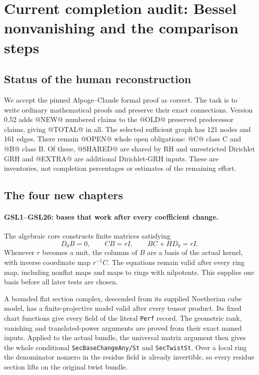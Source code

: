 \section{Current completion audit: Bessel nonvanishing and the comparison steps}
\label{sec:dependency-audit-v52}

\subsection{Status of the human reconstruction}

We accept the pinned Alpoge--Claude formal proof as correct. The task
is to write ordinary mathematical proofs and preserve their exact
connections. Version 0.52 adds @NEW@ numbered claims to the @OLD@
preserved predecessor claims, giving @TOTAL@ in all. The selected
sufficient graph has 121 nodes and 161 edges. There remain @OPEN@
whole open obligations: @C@ class C and @B@ class B. Of these,
@SHARED@ are shared by RH and unrestricted Dirichlet GRH and
@EXTRA@ are additional Dirichlet-GRH inputs. These are inventories,
not completion percentages or estimates of the remaining effort.

\subsection{The four new chapters}

\paragraph{GSL1--GSL26: bases that work after every coefficient change.}
The algebraic core constructs finite matrices satisfying
\[
 D_0B=0,\qquad CB=rI,\qquad BC+HD_0=rI.
\]
Whenever $r$ becomes a unit, the columns of $B$ are a basis of the
actual kernel, with inverse coordinate map $r^{-1}C$. The equations
remain valid after every ring map, including nonflat maps and maps
to rings with nilpotents. This supplies one basis before all later
tests are chosen.

A bounded flat section complex, descended from its supplied
Noetherian cube model, has a finite-projective model valid after
every tensor product. Its fixed chart functions give every field of
the literal \texttt{Perf} record. The geometric rank, vanishing
and translated-power arguments are proved from their exact named
inputs. Applied to the actual bundle, the universal matrix argument
then gives the whole conditional \texttt{SecBaseChangeAny/St} and
\texttt{SecTwistSt}. Over a local ring the denominator nonzero in
the residue field is already invertible, so every residue section
lifts on the original twist bundle.

